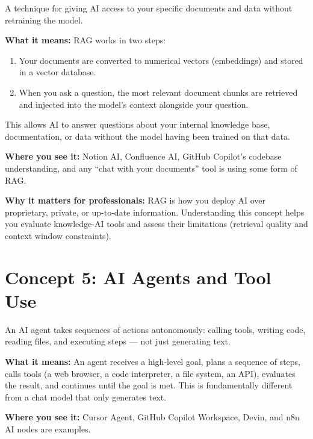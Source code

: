\begin{conceptbox}
A technique for giving AI access to your specific documents and data without retraining
the model.
\end{conceptbox}

\textbf{What it means:}
RAG works in two steps:
\begin{enumerate}
  \item Your documents are converted to numerical vectors (embeddings) and stored in
        a vector database.
  \item When you ask a question, the most relevant document chunks are retrieved and
        injected into the model's context alongside your question.
\end{enumerate}
This allows AI to answer questions about your internal knowledge base, documentation,
or data without the model having been trained on that data.

\textbf{Where you see it:}
Notion AI, Confluence AI, GitHub Copilot's codebase understanding, and any
``chat with your documents'' tool is using some form of RAG.

\textbf{Why it matters for professionals:}
RAG is how you deploy AI over proprietary, private, or up-to-date information.
Understanding this concept helps you evaluate knowledge-AI tools and assess their
limitations (retrieval quality and context window constraints).

\section{Concept 5: AI Agents and Tool Use}
\label{sec:agents}

\begin{conceptbox}
An AI agent takes sequences of actions autonomously: calling tools, writing code,
reading files, and executing steps --- not just generating text.
\end{conceptbox}

\textbf{What it means:}
An agent receives a high-level goal, plans a sequence of steps, calls tools (a web
browser, a code interpreter, a file system, an API), evaluates the result, and
continues until the goal is met.
This is fundamentally different from a chat model that only generates text.

\textbf{Where you see it:}
Cursor Agent, GitHub Copilot Workspace, Devin, and n8n AI nodes are examples.

